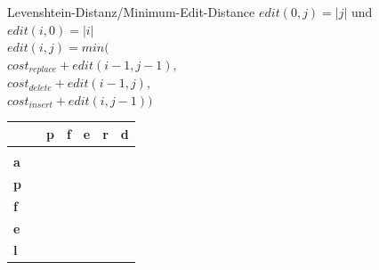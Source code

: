\documentclass[aspectratio=169]{beamer}
\begin{document}
\begin{frame}[fragile]{Levenshtein-Distanz/Minimum-Edit-Distance}
$edit(0,j)=|j|$ und $edit(i,0)=|i|$\\
$edit(i,j)=min($\\
$cost_{replace} + edit(i-1,j-1),  $\\
$cost_{delete}+ edit(i-1,j),$\\
$cost_{insert}+ edit(i,j-1))  $\\
\begin{table}[]
\begin{tabular}{|l|l|l|l|l|l|l|}
\hline
           & \textbf{} & \textbf{p} & \textbf{f} & \textbf{e} & \textbf{r} & \textbf{d} \\ \hline
\textbf{}  &           &            &            &            &            &            \\ \hline
\textbf{a} &           &            &            &            &            &            \\ \hline
\textbf{p} &           &            &            &            &            &            \\ \hline
\textbf{f} &           &            &            &            &            &            \\ \hline
\textbf{e} &           &            &            &            &            &            \\ \hline
\textbf{l} &           &            &            &            &            &            \\ \hline
\end{tabular}
\end{table}
\end{frame}
\end{document}
